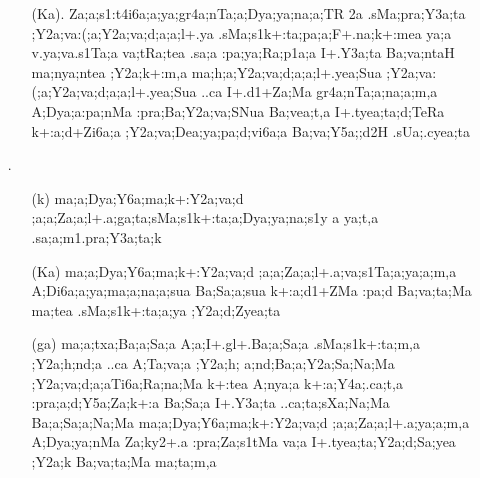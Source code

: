 \begin{spacing}{1.15}
\begin{itemize}
\begin{itemize}
      \item[({\sktf Ka}).] {\sktf Za;a;s1:t4i6a;a;ya;gr4a;nTa;a;Dya;ya;na;a;TR%
2a .sMa;pra;Y3a;ta ;Y2a;va:(;a;Y2a;va;d;a;a;l+.ya%
\ZF{-}.sMa;s1k+:ta;pa;a;F+.na;k+:mea ya;a v.ya{;va}.s1Ta;a va;tRa;tea\ZF{,} .sa;a :pa;ya;Ra;p1a;a I+.Y3a;ta Ba;va;ntaH
ma;nya;ntea ;Y2a;k+:m,a ma;h;a;Y2a;va;d;a;a;l+.yea;Sua
;Y2a;va:(;a;Y2a;va;d;a;a;l+.yea;Sua ..ca
I+.d1+Za;Ma gr4a{;nTa;a};na;a;m,a {A}{;Dya;a}{:pa};nMa {:pra};Ba;Y2a;va;SNua Ba;vea;t,a\ZF{,} I+.tyea;ta;d;TeRa
k+:a;d+Zi6a;a
;Y2a;va;Dea;ya;pa;d;vi6a;a Ba;va;Y5a;;d2H
.sUa;.cyea;ta}
               \end{itemize}

\item[{\sktf 13}.] \begin{itemize}
    \item[({\sktf k})] {\sktf ma;a;Dya;Y6a;ma;k+:Y2a;va;d%
;a;a;Za;a;l+.a;ga;ta;sMa;s1k+:ta;a;Dya;ya;na;s1y%
a ya;t,a .sa;a;m1.pra;Y3a;ta;k}

     \item[({\sktf Ka})] {\sktf ma;a;Dya;Y6a;ma;k+:Y2a;va;d%
;a;a;Za;a;l+.a;va;s1Ta;a;ya;a;m,a A;Di6a;a;ya;ma;a;na;a;sua
Ba;Sa;a;sua k+:a;d1+ZMa :pa;d Ba;va;ta;Ma ma{;tea} {.sMa};s1k+:ta;a;ya ;Y2a;d;Zyea;ta }
            
            \item[({\sktf ga})] {\sktf ma;a;txa;Ba;a;Sa;a\ZF{,}
A;a;I+.gl+.Ba;a;Sa;a\ZF{,} .sMa;s1k+:ta;m,a\ZF{,}
;Y2a;h;nd;a ..ca \ZF{(}A;Ta;va;a\ZF{,} ;Y2a;h;%
a;nd;Ba;a;Y2a;Sa;Na;Ma ;Y2a;va{;d;a;a}{Ti6a;Ra};na;Ma {k+:tea} A;nya;a k+:a;Y4a;.ca;t,a
:pra;a;d;Y5a;Za;k+:a Ba;Sa;a\ZF{),} I+.Y3a;ta
..ca;ta;sXa;Na;Ma Ba;a;Sa;a;Na;Ma ma;a;Dya;Y6a;ma;k+:Y2a;va;d%
;a;a;Za;a;l+.a;ya;a;m,a A;Dya;ya;nMa Za;ky2+.a :pra;Za;s1tMa va;a\ZF{,} I+.tyea;ta;Y2a;d;Sa;yea
;Y2a;k Ba;va;ta;Ma ma;ta;m,a}
            

\end{itemize}
\end{itemize}
\end{spacing}
